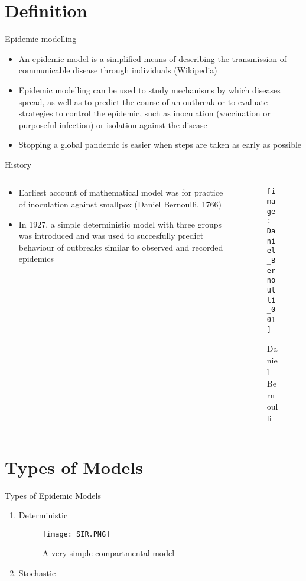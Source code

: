 \documentclass{beamer}
\begin{document}
\section{Definition}

\begin{frame}{Epidemic modelling}
\begin{itemize}
\item An epidemic model is a simplified means of describing the transmission of communicable disease through individuals (Wikipedia)
\item Epidemic modelling can be used to study mechanisms by which diseases spread, as well as to predict the course of an outbreak or to evaluate strategies to control the epidemic, such as inoculation (vaccination or purposeful infection) or isolation against the disease
\item Stopping a global pandemic is easier when steps are taken as early as possible
\end{itemize}
\end{frame}

\begin{frame}{History}
\begin{columns}
\begin{column}{.60\textwidth}
\begin{itemize}
\item Earliest account of mathematical model was for practice of inoculation against smallpox (Daniel Bernoulli, 1766)
\item In 1927, a simple deterministic model with three groups was introduced and was used to succesfully predict behaviour of outbreaks similar to observed and recorded epidemics
\end{itemize}
\end{column}%
\hfill%
\begin{column}{.38\textwidth}
\begin{figure}[ht]
  \begin{center}
      \texttt{[image: Daniel\_Bernoulli\_001]}
    \caption{Daniel Bernoulli}\label{bernoulli}
 \end{center}
\end{figure}
\end{column}%
\end{columns}
\end{frame}

\section{Types of Models}
\begin{frame}{Types of Epidemic Models}
\begin{enumerate}
\item Deterministic
\begin{figure}[ht]
  \begin{center}
      \texttt{[image: SIR.PNG]}
    \caption{A very simple compartmental model}\label{bernoulli}
 \end{center}
\end{figure}
\item Stochastic
\end{enumerate}
\end{frame}
\end{document}
